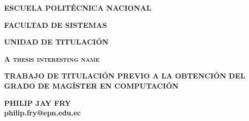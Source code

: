 \begin{titlepage}
    \begin{center}
        \vspace*{0.5\baselineskip}
        
        
        \textbf{{\fontsize{2em}{2em} \selectfont ESCUELA POLITÉCNICA NACIONAL}}
        
        \vspace*{0.5\baselineskip}
        \vspace*{\baselineskip}
        \large{\textbf{FACULTAD DE SISTEMAS}}\\
        
        \vspace*{\baselineskip}
        
        \large{\textbf{UNIDAD DE TITULACIÓN}}\\
        
        \vspace*{\baselineskip}
        \vspace*{\baselineskip}
        
        \large{\textbf{\textsc{A thesis interesting name}}}\\
        
        \vspace*{\baselineskip}
        \vspace*{\baselineskip}
        \vspace*{0.5\baselineskip}
        
        \textbf{\normalsize{TRABAJO DE TITULACIÓN PREVIO A LA OBTENCIÓN DEL GRADO DE MAGÍSTER EN COMPUTACIÓN}}\\
        
        \vspace*{\baselineskip}
        \vspace*{\baselineskip}
        \vspace*{0.5\baselineskip}
        
        \textbf{\normalsize{PHILIP JAY FRY}}\\
        \textbf{\normalsize{philip.fry@epn.edu.ec}}\\
        
        \vspace*{\baselineskip}
        \vspace*{\baselineskip}
        

\end{center}
\end{titlepage}
